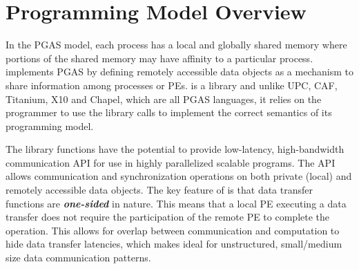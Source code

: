 \section{Programming Model Overview}
In the \ac{PGAS} model, each process has a local and globally shared memory where portions of the shared memory may have affinity to a particular process. \openshmem implements \ac{PGAS} by defining remotely 
accessible data objects as a mechanism to share information among \openshmem processes or \acp{PE}. \openshmem is a library and unlike UPC, CAF, Titanium, X10 and Chapel, which are all PGAS languages, it relies on 
the programmer to use the library calls  to implement the correct semantics of its programming model.

The \openshmem library functions have the potential to provide low-latency, high-bandwidth communication \ac{API} for use in highly parallelized scalable programs. The \ac{API} allows communication and synchronization 
operations on both private (local) and remotely accessible data objects. The key feature of \openshmem is that data transfer functions are \textit{\textbf{one-sided}} in nature. This means that a local \ac{PE} executing a data 
transfer does not require the participation of the remote \ac{PE} to complete the operation. This allows for overlap between communication and computation to hide data transfer latencies, which makes  \openshmem ideal for 
unstructured, small/medium size data communication patterns.


